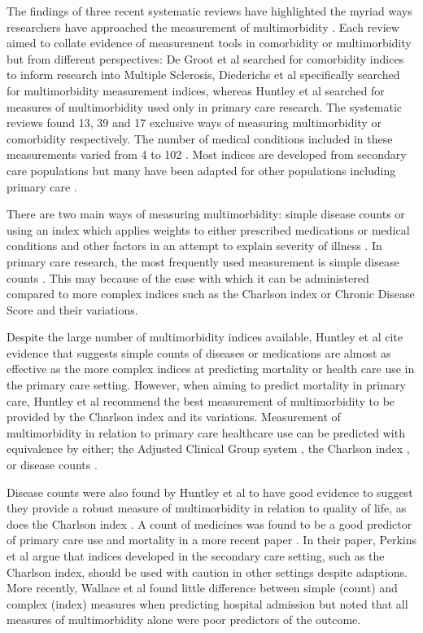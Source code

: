 \documentclass[12pt,]{report}
\begin{document}
The findings of three recent systematic reviews have highlighted the
myriad ways researchers have approached the measurement of
multimorbidity \citep{RN16, RN34, RN29}. Each review aimed to collate
evidence of measurement tools in comorbidity or multimorbidity but from
different perspectives: De Groot et al \citeyearpar{RN16} searched for
comorbidity indices to inform research into Multiple Sclerosis,
Diederichs et al \citeyearpar{RN34} specifically searched for
multimorbidity measurement indices, whereas Huntley et al
\citeyearpar{RN29} searched for measures of multimorbidity used only in
primary care research. The systematic reviews found 13, 39 and 17
exclusive ways of measuring multimorbidity or comorbidity respectively.
The number of medical conditions included in these measurements varied
from 4 to 102 \citeyearpar{RN34}. Most indices are developed from
secondary care populations but many have been adapted for other
populations including primary care \citep{RN34, RN29}.

There are two main ways of measuring multimorbidity: simple disease
counts or using an index which applies weights to either prescribed
medications or medical conditions and other factors in an attempt to
explain severity of illness \citep{RN16, RN34, RN29}. In primary care
research, the most frequently used measurement is simple disease counts
\citep{RN29}. This may because of the ease with which it can be
administered compared to more complex indices such as the Charlson index
\citep{RN339} or Chronic Disease Score \citep{RN340} and their
variations.

Despite the large number of multimorbidity indices available, Huntley et
al \citeyearpar{RN29} cite evidence that suggests simple counts of
diseases or medications are almost as effective as the more complex
indices at predicting mortality or health care use in the primary care
setting. However, when aiming to predict mortality in primary care,
Huntley et al \citeyearpar{RN29} recommend the best measurement of
multimorbidity to be provided by the Charlson index \citep{RN339} and
its variations. Measurement of multimorbidity in relation to primary
care healthcare use can be predicted with equivalence by either; the
Adjusted Clinical Group system \citep{RN341}, the Charlson index
\citep{RN339}, or disease counts \citep{RN29}.

Disease counts were also found by Huntley et al \citeyearpar{RN29} to
have good evidence to suggest they provide a robust measure of
multimorbidity in relation to quality of life, as does the Charlson
index \citep{RN339}. A count of medicines was found to be a good
predictor of primary care use and mortality in a more recent paper
\citep{RN247}. In their paper, Perkins et al \citeyearpar{RN78} argue
that indices developed in the secondary care setting, such as the
Charlson index, should be used with caution in other settings despite
adaptions. More recently, Wallace et al \citeyearpar{RN228} found little
difference between simple (count) and complex (index) measures when
predicting hospital admission but noted that all measures of
multimorbidity alone were poor predictors of the outcome.
\end{document}
